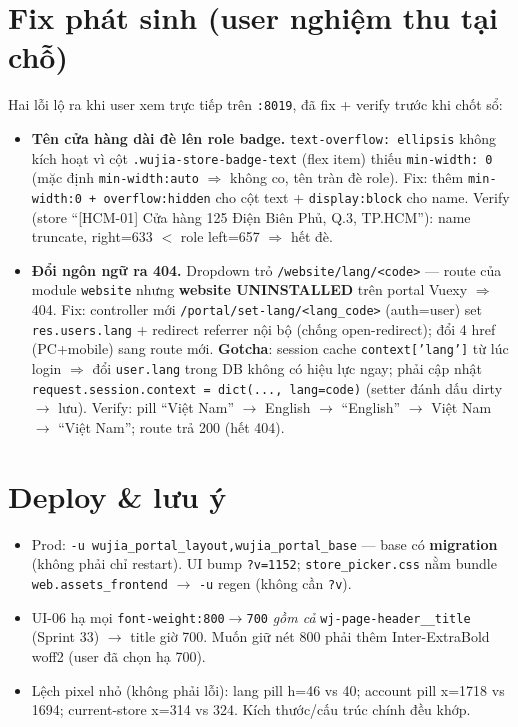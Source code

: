\section{Fix phát sinh (user nghiệm thu tại chỗ)}

Hai lỗi lộ ra khi user xem trực tiếp trên \texttt{:8019}, đã fix + verify trước khi chốt sổ:

\begin{itemize}
  \item \textbf{Tên cửa hàng dài đè lên role badge.} \texttt{text-overflow: ellipsis} không kích hoạt
    vì cột \texttt{.wujia-store-badge-text} (flex item) thiếu \texttt{min-width: 0} (mặc định
    \texttt{min-width:auto} $\Rightarrow$ không co, tên tràn đè role). Fix: thêm \texttt{min-width:0 +
    overflow:hidden} cho cột text + \texttt{display:block} cho name. Verify (store ``[HCM-01] Cửa hàng
    125 Điện Biên Phủ, Q.3, TP.HCM''): name truncate, right=633 $<$ role left=657 $\Rightarrow$ hết đè.
  \item \textbf{Đổi ngôn ngữ ra 404.} Dropdown trỏ \texttt{/website/lang/<code>} --- route của module
    \texttt{website} nhưng \textbf{website UNINSTALLED} trên portal Vuexy $\Rightarrow$ 404. Fix: controller
    mới \texttt{/portal/set-lang/<lang\_code>} (auth=user) set \texttt{res.users.lang} + redirect
    referrer nội bộ (chống open-redirect); đổi 4 href (PC+mobile) sang route mới. \textbf{Gotcha}:
    session cache \texttt{context['lang']} từ lúc login $\Rightarrow$ đổi \texttt{user.lang} trong DB
    không có hiệu lực ngay; phải cập nhật \texttt{request.session.context = dict(..., lang=code)}
    (setter đánh dấu dirty $\to$ lưu). Verify: pill ``Việt Nam'' $\to$ English $\to$ ``English'' $\to$
    Việt Nam $\to$ ``Việt Nam''; route trả 200 (hết 404).
\end{itemize}

\section{Deploy \& lưu ý}

\begin{itemize}
  \item Prod: \texttt{-u wujia\_portal\_layout,wujia\_portal\_base} --- base có \textbf{migration}
    (không phải chỉ restart). UI bump \texttt{?v=1152}; \texttt{store\_picker.css} nằm bundle
    \texttt{web.assets\_frontend} $\to$ \texttt{-u} regen (không cần \texttt{?v}).
  \item UI-06 hạ mọi \texttt{font-weight:800$\to$700} \emph{gồm cả} \texttt{wj-page-header\_\_title}
    (Sprint 33) $\to$ title giờ 700. Muốn giữ nét 800 phải thêm Inter-ExtraBold woff2 (user đã chọn hạ 700).
  \item Lệch pixel nhỏ (không phải lỗi): lang pill h=46 vs 40; account pill x=1718 vs 1694;
    current-store x=314 vs 324. Kích thước/cấu trúc chính đều khớp.
\end{itemize}
